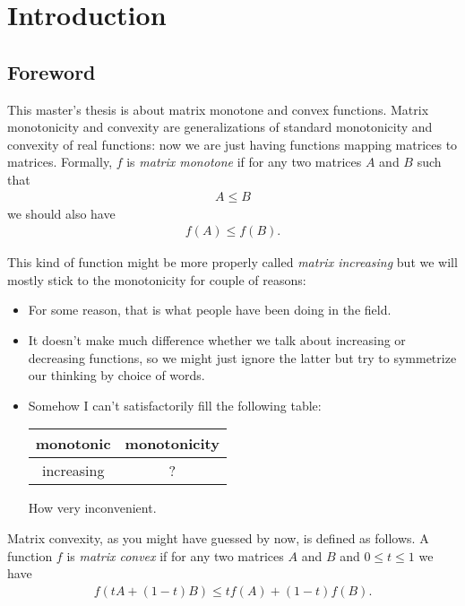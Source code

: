 \chapter{Introduction}

\section{Foreword}

This master's thesis is about matrix monotone and convex functions. Matrix monotonicity and convexity are generalizations of standard monotonicity and convexity of real functions: now we are just having functions mapping matrices to matrices. Formally, $f$ is \textit{matrix monotone} if for any two matrices $A$ and $B$ such that
\begin{align}
	A \leq B
\end{align}
we should also have
\begin{align}
	f(A) \leq f(B).
\end{align}

This kind of function might be more properly called \textit{matrix increasing} but we will mostly stick to the monotonicity for couple of reasons:
\begin{itemize}
	\item For some reason, that is what people have been doing in the field.
	\item It doesn't make much difference whether we talk about increasing or decreasing functions, so we might just ignore the latter but try to symmetrize our thinking by choice of words.
	\item Somehow I can't satisfactorily fill the following table:
	\begin{center}
	\begin{tabular}{| c | c |}
		\hline
		monotonic & monotonicity \\
		\hline
		increasing & ? \\
		\hline
	\end{tabular}
	\end{center}
	How very inconvenient.
\end{itemize}

Matrix convexity, as you might have guessed by now, is defined as follows. A function $f$ is \textit{matrix convex} if for any two matrices $A$ and $B$ and $0 \leq t \leq 1$ we have
\begin{align}
	f(t A + (1 - t) B) \leq t f(A) + (1 - t) f(B).
\end{align}

